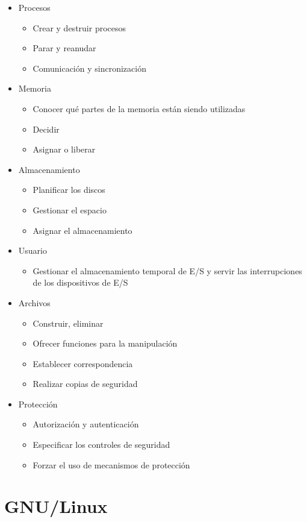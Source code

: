 \documentclass[12pt,a4paper]{report}
\begin{document}
\begin{itemize}
	\item Procesos
	\begin{itemize}
	\item Crear y destruir procesos
	\item Parar y reanudar
	\item Comunicaci\'{o}n y sincronizaci\'{o}n
	\end{itemize}
	\item Memoria
	\begin{itemize}
	\item Conocer qu\'{e} partes de la memoria est\'{a}n siendo utilizadas
	\item Decidir
	\item Asignar o liberar	
	\end{itemize}
	\item Almacenamiento
	\begin{itemize}
	\item Planificar los discos
	\item Gestionar el espacio
	\item Asignar el almacenamiento	
	\end{itemize}
	\item Usuario
	\begin{itemize}
	\item Gestionar el almacenamiento temporal de E/S y servir las interrupciones de los dispositivos de E/S	
	\end{itemize}
	\item Archivos
	\begin{itemize}
	\item Construir, eliminar
	\item Ofrecer funciones para la manipulaci\'{o}n
	\item Establecer correspondencia
	\item Realizar copias de seguridad	
	\end{itemize}
	\item Protecci\'{o}n
	\begin{itemize}
	\item Autorizaci\'{o}n y autenticaci\'{o}n
	\item Especificar los controles de seguridad
	\item Forzar el uso de mecanismos de protecci\'{o}n	
	\end{itemize}
\end{itemize}

\chapter{GNU/Linux}
\end{document}
